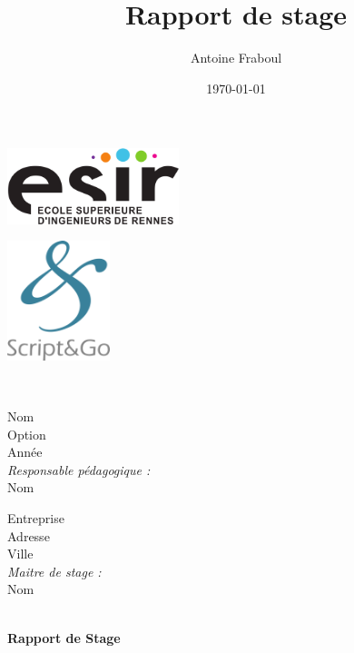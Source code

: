 \documentclass[12pt]{article}
\title{Rapport de stage}
\author{Antoine Fraboul}
\date{\today}
\begin{document}
\begin{titlepage}
\begin{center}
	\begin{minipage}[t]{0.48\textwidth}
			\begin{flushleft}
			\includegraphics [width=50mm]{./images/logoESIR.png} \\[0.5cm]
			\end{flushleft}
	\end{minipage}
	\begin{minipage}[t]{0.48\textwidth}
			\begin{flushright}
			\includegraphics [width=30mm]{./images/logoS&G.png} \\[0.5cm]
			\end{flushright}
	\end{minipage}\\[2cm]
	\begin{minipage}[t]{0.3\textwidth}
			\begin{flushleft} \large
			Nom \\
      Option \\
      Année \\
      \vspace{5mm}
      \emph{Responsable pédagogique :} \\
      Nom
      \end{flushleft}
	\end{minipage}
	\begin{minipage}[t]{0.6\textwidth}
			\begin{flushright} \large
      Entreprise \\
      Adresse \\
      Ville \\
      \vspace{5mm}
      \emph{Maitre de stage :} \\
      Nom
			\end{flushright}
	\end{minipage}\\[5cm]
  			{\huge \bfseries Rapport de Stage
				}
\end{center}
\end{titlepage}
\end{document}
